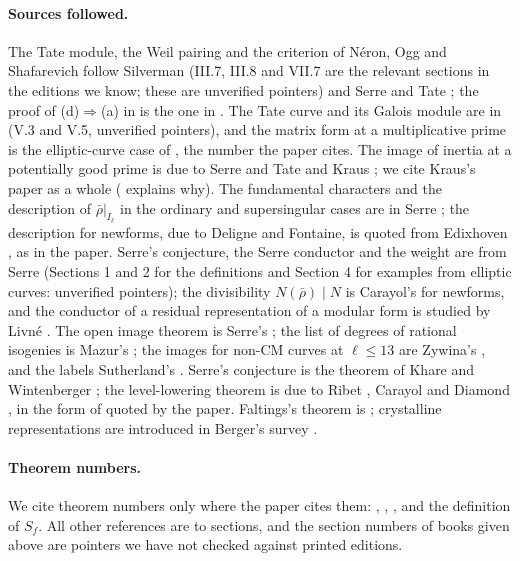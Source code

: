 \paragraph{Sources followed.} The Tate module, the Weil pairing and the criterion of N\'eron, Ogg and Shafarevich follow Silverman
\cite[Chapters III and VII]{SilvermanAEC} (III.7, III.8 and VII.7 are the relevant sections in the editions we know; these are unverified pointers) and
Serre and Tate \cite[Sections 1 and 2]{SerreTate68}; the proof of (d)$\Rightarrow$(a) in  is the one in \cite[Section 1]{SerreTate68}. The Tate
curve and its Galois module are in \cite[Chapter V]{SilvermanATAEC} (V.3 and V.5, unverified pointers), and the matrix form at a multiplicative prime
is the elliptic-curve case of \cite[Theorem 3.1(e)]{DDT}, the number the paper cites. The image of inertia at a potentially good prime is due to
Serre and Tate \cite[Section 2]{SerreTate68} and Kraus \cite{Kraus90}; we cite Kraus's paper as a whole ( explains why). The fundamental
characters and the description of $\bar\rho|_{I_\ell}$ in the ordinary and supersingular cases are in Serre \cite[Section 1]{Serre72}; the description for
newforms, due to Deligne and Fontaine, is quoted from Edixhoven \cite[Section 2]{Edixhoven92}, as in the paper. Serre's conjecture, the Serre conductor
and the weight are from Serre \cite{Serre87} (Sections 1 and 2 for the definitions and Section 4 for examples from elliptic curves: unverified
pointers); the divisibility $N(\bar\rho)\mid N$ is Carayol's \cite{Carayol89} for newforms, and the conductor of a residual representation of a modular
form is studied by Livn\'e \cite{Livne89}. The open image theorem is Serre's \cite{Serre72}; the list of degrees of rational isogenies is Mazur's
\cite{Mazur78}; the images for non-CM curves at $\ell\le13$ are Zywina's \cite{Zywina15}, and the labels Sutherland's \cite{Sutherland16}. Serre's conjecture
is the theorem of Khare and Wintenberger \cite{KhareWintenberger}; the level-lowering theorem is due to Ribet \cite{Ribet90}, Carayol \cite{Carayol89} and Diamond
\cite{Diamond95}, in the form of \cite[Theorem 3.15]{DDT} quoted by the paper. Faltings's theorem is \cite{Faltings83}; crystalline representations are
introduced in Berger's survey \cite{Berger}.

\paragraph{Theorem numbers.} We cite theorem numbers only where the paper cites them: \cite[Theorem 3.1(e)]{DDT}, \cite[Theorem 3.15]{DDT}, \cite[Section
2]{Edixhoven92}, and the definition \cite[(31)]{DFG04} of $S_f$. All other references are to sections, and the section numbers of books given above are
pointers we have not checked against printed editions.

